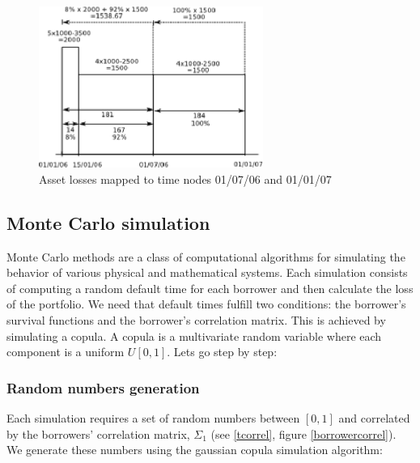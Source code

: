 \documentclass[a4paper,12pt,final]{article}
\begin{document}
\begin{figure}[!hbtp]
\begin{center}
\includegraphics[width=7.34cm, angle=0]{./images/lossesmapping.eps}
\caption{Asset losses mapped to time nodes 01/07/06 and 01/01/07}
\label{lossesmapping}
\end{center}
\end{figure}
\FloatBarrier

\subsection{Monte Carlo simulation}
\label{mcsim}
Monte Carlo methods \cite{mc:mervyn} are a class of computational algorithms for 
simulating the behavior of various physical and mathematical systems. 
Each simulation consists of computing a random default time for each borrower and
then calculate the loss of the portfolio. We need that default times fulfill two 
conditions: the borrower's survival functions and the borrower's correlation matrix. 
This is achieved by simulating a copula. A copula \cite{copu:pitfalls} 
\cite{copu:wang} is a multivariate random variable where each component is a 
uniform $U[0,1]$. Lets go step by step:

\subsubsection{Random numbers generation}
Each simulation requires a set of random numbers between $[0, 1]$ and correlated 
by the borrowers' correlation matrix, $\Sigma_1$ (see \ref{tcorrel}, figure 
\ref{borrowercorrel}). We generate these numbers using the gaussian copula simulation 
algorithm:
\end{document}
